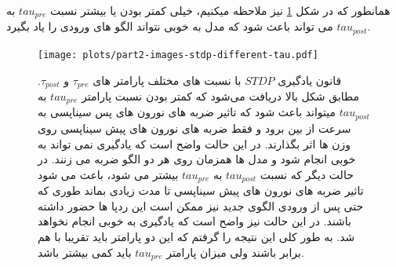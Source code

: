             همانطور که در شکل 
            \ref{fig:part2-images-stdp-different-tau}
            نیز ملاحظه میکنیم، خیلی کمتر بودن یا بیشتر نسبت 
            $tau_{pre}$ 
            به 
            $tau_{post}$ 
            می تواند باعث شود که مدل به خوبی نتواند الگو های ورودی را یاد بگیرد.
            \begin{figure}[htbp]
                \centering
                \texttt{[image: plots/part2-images-stdp-different-tau.pdf]} 
                \caption{قانون یادگیری 
                $STDP$ 
                با نسبت های مختلف پارامتر های 
                $\tau_{pre}$ و $\tau_{post}$.
                مطابق شکل بالا دریافت می‌شود که کمتر بودن نسبت پارامتر 
                $tau_{pre}$ 
                به 
                $tau_{post}$ 
                میتواند باعث شود که تاثیر ضربه های نورون های پس سیناپسی  به سرعت از بین برود و فقط ضربه های نورون های پیش سیناپسی روی وزن ها اثر بگذارند. در این حالت واضح است که یادگیری نمی تواند به خوبی انجام شود و مدل ها همزمان روی هر دو الگو ضربه می زنند. در حالت دیگر که نسبت 
                $tau_{post}$ 
                به 
                $tau_{pre}$ 
                بیشتر می شود، باعث می شود تاثیر ضربه های نورون های پیش سیناپسی تا مدت زیادی بماند طوری که حتی پس از ورودی الگوی جدید نیز ممکن است این ردپا ها حضور داشته باشند. در این حالت نیز واضح است که یادگیری به خوبی انجام نخواهد شد. به طور کلی این نتیجه را گرفتم که این دو پارامتر باید تقریبا با هم برابر باشند ولی میزان پارامتر 
                $tau_{pre}$ 
                باید کمی بیشتر باشد.
                }
                \label{fig:part2-images-stdp-different-tau}
            \end{figure}

        \clearpage
